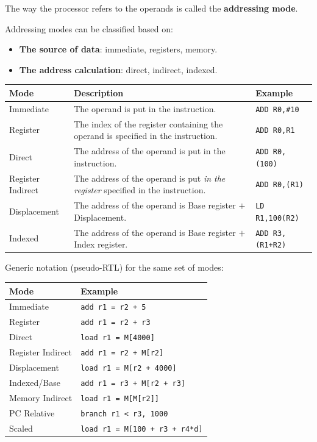 \begin{definition}
The way the processor refers to the operands is called the
\textbf{addressing mode}.
\end{definition}
Addressing modes can be classified based on:
\begin{itemize}
  \item \textbf{The source of data}: immediate, registers, memory.
  \item \textbf{The address calculation}: direct, indirect, indexed.
\end{itemize}

\begin{center}
\begin{tabular}{@{}p{4cm}p{7cm}l@{}}
\toprule
Mode & Description & Example \\
\midrule
Immediate & The operand is put in the instruction. & \texttt{ADD R0,\#10} \\
Register & The index of the register containing the operand is specified in
the instruction. & \texttt{ADD R0,R1} \\
Direct & The address of the operand is put in the instruction. & \texttt{ADD
R0,(100)} \\
Register Indirect & The address of the operand is put \emph{in the register}
specified in the instruction. & \texttt{ADD R0,(R1)} \\
Displacement & The address of the operand is Base register $+$
Displacement. & \texttt{LD R1,100(R2)} \\
Indexed & The address of the operand is Base register $+$ Index register. &
\texttt{ADD R3,(R1+R2)} \\
\bottomrule
\end{tabular}
\end{center}

Generic notation (pseudo-RTL) for the same set of modes:

\begin{center}
\begin{tabular}{@{}ll@{}}
\toprule
Mode & Example \\
\midrule
Immediate       & \texttt{add r1 = r2 + 5} \\
Register        & \texttt{add r1 = r2 + r3} \\
Direct          & \texttt{load r1 = M[4000]} \\
Register Indirect & \texttt{add r1 = r2 + M[r2]} \\
Displacement    & \texttt{load r1 = M[r2 + 4000]} \\
Indexed/Base    & \texttt{add r1 = r3 + M[r2 + r3]} \\
Memory Indirect & \texttt{load r1 = M[M[r2]]} \\
PC Relative     & \texttt{branch r1 < r3, 1000} \\
Scaled          & \texttt{load r1 = M[100 + r3 + r4*d]} \\
\bottomrule
\end{tabular}
\end{center}

